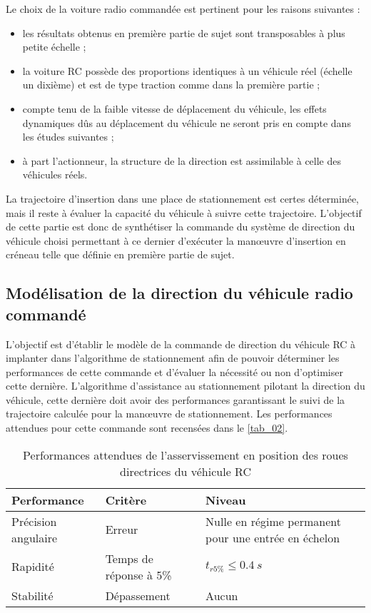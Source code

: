 Le choix de la voiture radio commandée est pertinent pour les raisons suivantes :
\begin{itemize}
\item les résultats obtenus en première partie de sujet sont transposables à plus petite échelle ;
\item la voiture RC possède des proportions identiques à un véhicule réel (échelle un dixième) et est de type
traction comme dans la première partie ;
\item compte tenu de la faible vitesse de déplacement du véhicule, les effets dynamiques dûs au déplacement du
véhicule ne seront pris en compte dans les études suivantes ;
\item à part l’actionneur, la structure de la direction est assimilable à celle des véhicules réels.
\end{itemize}

\begin{obj}
La trajectoire d’insertion dans une place de stationnement est certes déterminée, mais il reste à évaluer
la capacité du véhicule à suivre cette trajectoire. L’objectif de cette partie est donc de synthétiser la
commande du système de direction du véhicule choisi permettant à ce dernier d’exécuter la manœuvre
d’insertion en créneau telle que définie en première partie de sujet.
\end{obj}

\subsection{Modélisation de la direction du véhicule radio commandé}

L’objectif est d’établir le modèle de la commande de direction du véhicule RC à implanter dans l’algorithme
de stationnement afin de pouvoir déterminer les performances de cette commande et d’évaluer la nécessité ou
non d’optimiser cette dernière. L’algorithme d’assistance au stationnement pilotant la direction du véhicule,
cette dernière doit avoir des performances garantissant le suivi de la trajectoire calculée pour la manœuvre de
stationnement.
Les performances attendues pour cette commande sont recensées dans le \autoref{tab_02}.

\begin{table}[H]
\centering
\begin{tabular}{lll}
\hline
Performance &Critère& Niveau \\
\hline 
Précision angulaire & Erreur &Nulle en régime permanent pour une entrée en échelon \\
Rapidité &Temps de réponse à 5\% & $t_{r5\%}\leq \SI{0,4}{s}$ \\
Stabilité &Dépassement &Aucun \\ \hline
\end{tabular}
\caption{Performances attendues de l’asservissement en position des roues directrices du véhicule RC
 \label{tab_02}}
\end{table}

